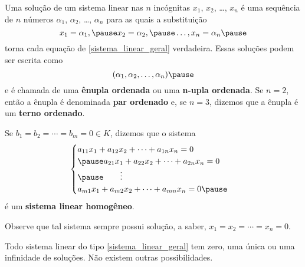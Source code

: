 \documentclass{beamer}
\begin{document}
    \begin{frame}
        \vspace{.3cm}

        Uma solução de um sistema linear nas $n$ incógnitas $x_1$, $x_2$, \dots, $x_n$ \pause é uma sequência de $n$ números \pause $\alpha_1$, \pause $\alpha_2$, \pause \dots, $\alpha_n$ \pause para as quais a substituição\pause
        \[
            x_1 = \alpha_1, \pause x_2 = \alpha_2, \pause \dots, x_n = \alpha_n\pause
        \]
        torna cada equação de \eqref{sistema_linear_geral} verdadeira. \pause Essas soluções podem ser escrita como\pause
        \[
            (\alpha_1, \alpha_2, \dots, \alpha_n)\pause
        \]
        e é chamada de uma \textbf{ênupla ordenada} \pause ou uma \textbf{n-upla ordenada}. \pause Se $n = 2$, então a ênupla é denominada \textbf{par ordenado} \pause e, se $n = 3$, dizemos que a ênupla é um \textbf{terno ordenado}.
    \end{frame}

    \begin{frame}
        Se $b_1 = b_2 = \cdots = b_m = 0 \in K$, \pause dizemos que o sistema\pause
        \begin{equation}\label{sistemalinearhomogeneo}\index{Sistema Linear}
            \begin{cases}
                a_{11}x_1 + a_{12}x_2 + \cdots + a_{1n}x_n = 0\\\pause
                a_{21}x_1 + a_{22}x_2 + \cdots + a_{2n}x_n = 0\\\pause
                \qquad \vdots\\
                a_{m1}x_1 + a_{m2}x_2 + \cdots + a_{mn}x_n = 0\pause
            \end{cases}
        \end{equation}
        é um \textbf{sistema linear homogêneo}. \pause

        \vspace{.3cm}

        Observe que tal sistema sempre possui solução, \pause a saber, $x_1 = x_2 = \cdots = x_n = 0$.
    \end{frame}

    \begin{frame}
        \begin{teorema}
            Todo sistema linear do tipo \eqref{sistema_linear_geral} tem zero, \pause uma única \pause ou uma infinidade de soluções. \pause Não existem outras possibilidades.
        \end{teorema}
    \end{frame}
\end{document}
